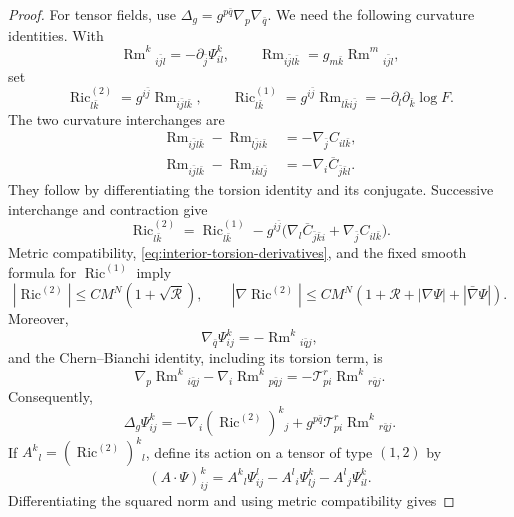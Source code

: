 \begin{proof}
For tensor fields, use $\Delta_g=g^{p\bar q}\nabla_p\nabla_{\bar q}$.
We need the following curvature identities. With
\[
  \operatorname{Rm}^k{}_{i\bar j l}=-\partial_{\bar j}\Psi^k_{il},
  \qquad
  \operatorname{Rm}_{i\bar j l\bar k}=g_{m\bar k}\operatorname{Rm}^m{}_{i\bar j l},
\]
set
\[
  \operatorname{Ric}^{(2)}_{l\bar k}=g^{i\bar j}\operatorname{Rm}_{i\bar j l\bar k},
  \qquad
  \operatorname{Ric}^{(1)}_{l\bar k}=g^{i\bar j}\operatorname{Rm}_{l\bar k i\bar j}
  =-\partial_l\partial_{\bar k}\log F.
\]
The two curvature interchanges are
\begin{align*}
  \operatorname{Rm}_{i\bar j l\bar k}-\operatorname{Rm}_{l\bar j i\bar k}
  &=-\nabla_{\bar j}C_{il\bar k},\\
  \operatorname{Rm}_{i\bar j l\bar k}-\operatorname{Rm}_{i\bar k l\bar j}
  &=-\nabla_i\overline{C}_{\bar j\bar k l}.
\end{align*}
They follow by differentiating the torsion identity and its conjugate. Successive interchange and contraction give
\begin{equation}\label{eq:interior-ricci-contraction}
  \operatorname{Ric}^{(2)}_{l\bar k}
  =\operatorname{Ric}^{(1)}_{l\bar k}
  -g^{i\bar j}\bigl(
    \nabla_l\overline C_{\bar j\bar k i}
    +\nabla_{\bar j}C_{il\bar k}
  \bigr).
\end{equation}
Metric compatibility, \eqref{eq:interior-torsion-derivatives}, and the fixed smooth formula for $\operatorname{Ric}^{(1)}$ imply
\begin{equation}\label{eq:interior-ricci2}
  |\operatorname{Ric}^{(2)}|\leq CM^N(1+\sqrt{\mathcal R}),
  \qquad
  |\nabla\operatorname{Ric}^{(2)}|
  \leq CM^N(1+\mathcal R+|\nabla\Psi|+|\bar\nabla\Psi|).
\end{equation}
Moreover,
\[
  \nabla_{\bar q}\Psi^k_{ij}=-\operatorname{Rm}^k{}_{i\bar q j},
\]
and the Chern--Bianchi identity, including its torsion term, is
\[
  \nabla_p\operatorname{Rm}^k{}_{i\bar q j}-\nabla_i\operatorname{Rm}^k{}_{p\bar q j}
  =-\mathcal T^r_{pi}\operatorname{Rm}^k{}_{r\bar q j}.
\]
Consequently,
\begin{equation}\label{eq:interior-laplacian-connection-difference}
  \Delta_g\Psi^k_{ij}
  =-\nabla_i(\operatorname{Ric}^{(2)})^k{}_j
  +g^{p\bar q}\mathcal T^r_{pi}\operatorname{Rm}^k{}_{r\bar q j}.
\end{equation}
If $A^k{}_l=(\operatorname{Ric}^{(2)})^k{}_l$, define its action on a tensor of type $(1,2)$ by
\[
  (A\mathbin{\cdot}\Psi)^k_{ij}
  =A^k{}_l\Psi^l_{ij}-A^l{}_i\Psi^k_{lj}-A^l{}_j\Psi^k_{il}.
\]
Differentiating the squared norm and using metric compatibility gives

\end{proof}
